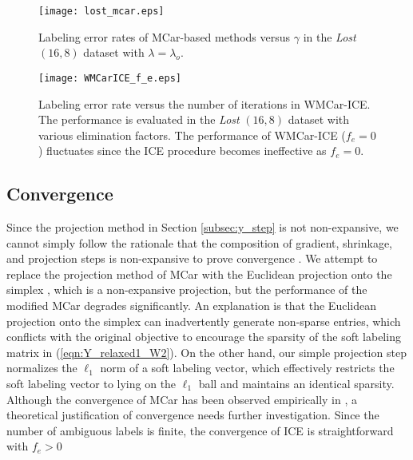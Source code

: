 \documentclass[10pt,journal,compsoc]{IEEEtran}
\begin{document}
\begin{figure}
\centering
\texttt{[image: lost\_mcar.eps]}
\caption{Labeling error rates of MCar-based methods versus $\gamma$ in the \emph{Lost} $(16,8)$ dataset with $\lambda = \lambda_o$.}\label{fig:parameter_tune}
\end{figure}


\begin{figure}
\centering
\texttt{[image: WMCarICE\_f\_e.eps]}
\caption{Labeling error rate versus the number of iterations in WMCar-ICE. The performance is evaluated in the \emph{Lost} $(16,8)$ dataset with various elimination factors. The performance of WMCar-ICE ($f_e = 0$) fluctuates since the ICE procedure becomes ineffective as $f_e = 0$.}\label{fig:WMCar_ICE_thre}
\end{figure}





\subsection{Convergence}
Since the projection method in Section \ref{subsec:y_step} is not non-expansive, we cannot simply follow the rationale that the composition of gradient, shrinkage, and projection steps is non-expansive to prove convergence \cite{Cabral2014}. We attempt to replace the projection method of MCar with the Euclidean projection onto the simplex \cite{Duchi2008epo}, which is a non-expansive projection, but the performance of the modified MCar degrades significantly. An explanation is that the Euclidean projection onto the simplex can inadvertently generate non-sparse entries, which conflicts with the original objective to encourage the sparsity of the soft labeling matrix in (\ref{eqn:Y_relaxed1_W2}).
On the other hand, our simple projection step normalizes the $\ell_1$ norm of a soft labeling vector, which effectively restricts the soft labeling vector to lying on the $\ell_1$ ball and maintains an identical sparsity. Although the convergence of MCar has been observed empirically in \cite{Chen2015mcf}, a theoretical justification of convergence needs further investigation. Since the number of ambiguous labels is finite, the convergence of ICE is straightforward with $f_e > 0$
\end{document}
